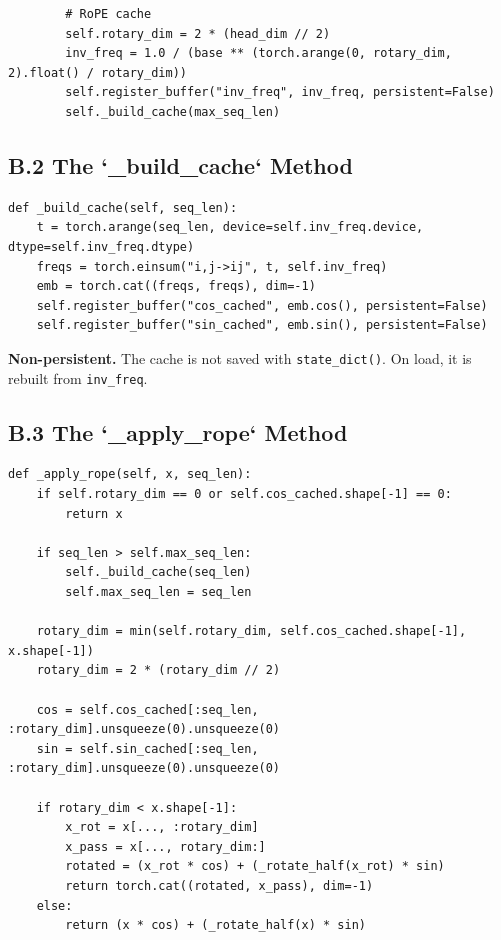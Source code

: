 {\begin{lstlisting}
        # RoPE cache
        self.rotary_dim = 2 * (head_dim // 2)
        inv_freq = 1.0 / (base ** (torch.arange(0, rotary_dim, 2).float() / rotary_dim))
        self.register_buffer("inv_freq", inv_freq, persistent=False)
        self._build_cache(max_seq_len)
\end{lstlisting}

\subsection{B.2 The `\_build\_cache` Method}

\begin{lstlisting}
def _build_cache(self, seq_len):
    t = torch.arange(seq_len, device=self.inv_freq.device, dtype=self.inv_freq.dtype)
    freqs = torch.einsum("i,j->ij", t, self.inv_freq)
    emb = torch.cat((freqs, freqs), dim=-1)
    self.register_buffer("cos_cached", emb.cos(), persistent=False)
    self.register_buffer("sin_cached", emb.sin(), persistent=False)
\end{lstlisting}

\textbf{Non-persistent.} The cache is not saved with \texttt{state\_dict()}. On load, 
it is rebuilt from \texttt{inv\_freq}.

\subsection{B.3 The `\_apply\_rope` Method}

\begin{lstlisting}
def _apply_rope(self, x, seq_len):
    if self.rotary_dim == 0 or self.cos_cached.shape[-1] == 0:
        return x
    
    if seq_len > self.max_seq_len:
        self._build_cache(seq_len)
        self.max_seq_len = seq_len
    
    rotary_dim = min(self.rotary_dim, self.cos_cached.shape[-1], x.shape[-1])
    rotary_dim = 2 * (rotary_dim // 2)
    
    cos = self.cos_cached[:seq_len, :rotary_dim].unsqueeze(0).unsqueeze(0)
    sin = self.sin_cached[:seq_len, :rotary_dim].unsqueeze(0).unsqueeze(0)
    
    if rotary_dim < x.shape[-1]:
        x_rot = x[..., :rotary_dim]
        x_pass = x[..., rotary_dim:]
        rotated = (x_rot * cos) + (_rotate_half(x_rot) * sin)
        return torch.cat((rotated, x_pass), dim=-1)
    else:
        return (x * cos) + (_rotate_half(x) * sin)
\end{lstlisting}

}
